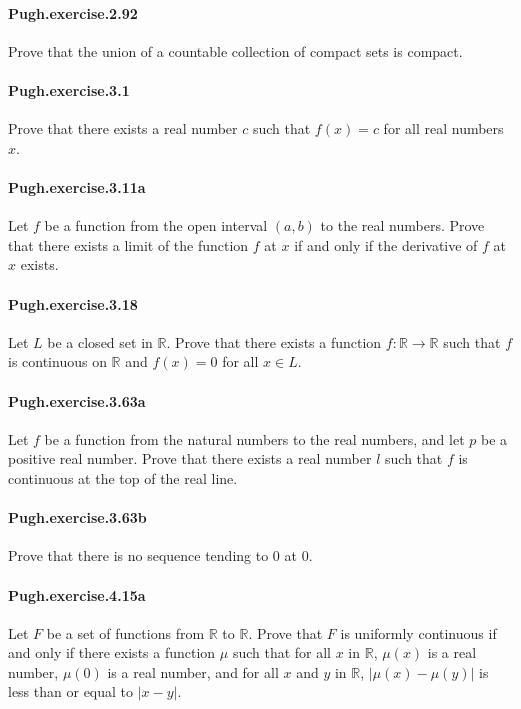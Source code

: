 \documentclass{article}
\begin{document}
\paragraph{Pugh.exercise.2.92} Prove that the union of a countable collection of compact sets is compact.

\paragraph{Pugh.exercise.3.1} Prove that there exists a real number $c$ such that $f(x) = c$ for all real numbers $x$.

\paragraph{Pugh.exercise.3.11a} Let $f$ be a function from the open interval $(a, b)$ to the real numbers. Prove that there exists a limit of the function $f$ at $x$ if and only if the derivative of $f$ at $x$ exists.

\paragraph{Pugh.exercise.3.18} Let $L$ be a closed set in $\mathbb{R}$. Prove that there exists a function $f : \mathbb{R} \to \mathbb{R}$ such that $f$ is continuous on $\mathbb{R}$ and $f(x) = 0$ for all $x \in L$.

\paragraph{Pugh.exercise.3.63a} Let $f$ be a function from the natural numbers to the real numbers, and let $p$ be a positive real number. Prove that there exists a real number $l$ such that $f$ is continuous at the top of the real line.

\paragraph{Pugh.exercise.3.63b} Prove that there is no sequence tending to $0$ at $0$.

\paragraph{Pugh.exercise.4.15a} Let $F$ be a set of functions from $\mathbb{R}$ to $\mathbb{R}$. Prove that $F$ is uniformly continuous if and only if there exists a function $\mu$ such that for all $x$ in $\mathbb{R}$, $\mu(x)$ is a real number, $\mu(0)$ is a real number, and for all $x$ and $y$ in $\mathbb{R}$, $|\mu(x) - \mu(y)|$ is less than or equal to $|x - y|$.
\end{document}
